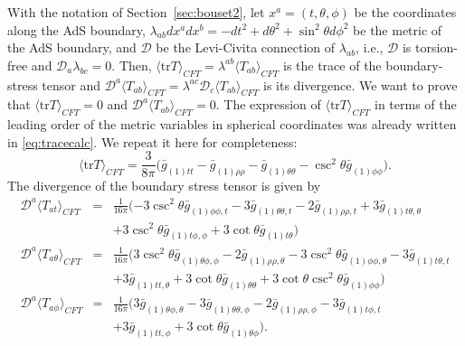 \documentclass[a4paper,11pt]{article}
\numberwithin{equation}{section}
\begin{document}
With the notation of Section~\ref{sec:bouset2}, let $x^a=(t,\theta,\phi)$ be the coordinates along the AdS boundary, $\lambda_{ab}dx^a dx^b=-dt^2+d\theta^2+\sin^2\theta d\phi^2$ be the metric of the AdS boundary, and $\mathcal{D}$ be the Levi-Civita connection of $\lambda_{ab}$, i.e., $\mathcal{D}$ is torsion-free and $\mathcal{D}_a\lambda_{bc}=0$. Then, $\langle \text{tr}T\rangle_{CFT}=\lambda^{ab}\langle T_{ab}\rangle_{CFT}$ is the trace of the boundary-stress tensor and $\mathcal{D}^a \langle T_{ab}\rangle_{CFT}=\lambda^{ac}\mathcal{D}_c \langle T_{ab}\rangle_{CFT}$ is its divergence. 
We want to prove that $\langle \text{tr}T\rangle_{CFT}=0$ and $\mathcal{D}^a \langle T_{ab}\rangle_{CFT}=0$. 
The expression of $\langle \text{tr}T\rangle_{CFT}$ in terms of the leading order of the metric variables in spherical coordinates was already written in \eqref{eq:tracecalc}. We repeat it here for completeness:
\begin{equation}
\label{eq:tracecalc2}
\langle \text{tr}T\rangle_{CFT}=\frac{3}{8\pi}\biggl(\bar{g}_{(1)tt}-\bar{g}_{(1)\rho\rho}-\bar{g}_{(1)\theta\theta}-\csc ^2\theta \bar{g}_{(1)\phi\phi}\biggr).
\end{equation}
The divergence of the boundary stress tensor is given by
\begin{eqnarray}
\label{eq:divergence_t}
\mathcal{D}^a \langle T_{at}\rangle_{CFT}&=&\frac{1}{16\pi}(-3 \csc ^2\theta  \bar{g}_{(1) \phi \phi ,t}-3 \bar{g}_{(1)\theta \theta ,t}-2 \bar{g}_{(1) \rho \rho ,t}+3 \bar{g}_{(1) \text{$t$$\theta $},\theta }\nonumber\\
&&+3 \csc^2\theta \bar{g}_{(1) \text{$t$$\phi $},\phi }+3 \cot \theta  \bar{g}_{(1)\text{$t$$\theta $}}) \\
\label{eq:divergence_theta}
\mathcal{D}^a \langle T_{a\theta}\rangle_{CFT}&=&\frac{1}{16\pi}(3 \csc ^2\theta  \bar{g}_{(1)\theta \phi ,\phi }-2 \bar{g}_{(1) \rho \rho ,\theta }-3 \csc
   ^2\theta \bar{g}_{(1) \phi \phi ,\theta }-3 \bar{g}_{(1) \text{$t$$\theta $},t}\nonumber\\
   &&+3
   \bar{g}_{(1) \text{$tt$},\theta }+3 \cot \theta  \bar{g}_{(1)\theta \theta }+3 \cot
   \theta \csc ^2\theta  \bar{g}_{(1) \phi \phi })\\
\label{eq:divergence_phi}
\mathcal{D}^a \langle T_{a\phi}\rangle_{CFT}&=&\frac{1}{16\pi}(3 \bar{g}_{(1)\theta \phi ,\theta }-3 \bar{g}_{(1)\theta \theta ,\phi }-2 \bar{g}_{(1) \rho
   \rho ,\phi }-3 \bar{g}_{(1) \text{$t$$\phi $},t}\nonumber\\
   &&+3 \bar{g}_{(1) \text{$tt$},\phi }+3 \cot\theta \bar{g}_{(1)\theta \phi }).
\end{eqnarray}
\end{document}
